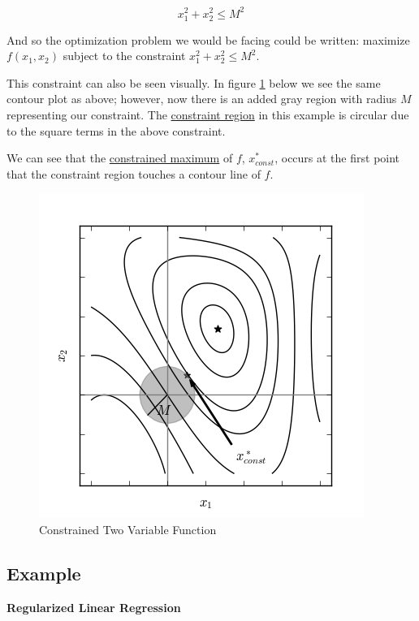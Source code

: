 \documentclass[a4paper, 12pt]{article}
\begin{document}
$$ x^2_1 + x^2_2 \leq M^2 $$

And so the optimization problem we would be facing could be written: maximize $f(x_1, x_2)$ subject to the constraint $ x^2_1 + x^2_2 \leq M^2 $.

\vspace{1pc}

This constraint can also be seen visually. In figure \ref{fig:two_const} below we see the same contour plot as above; however, now there is an added gray region with radius $M$ representing our constraint. The \underline{constraint region} in this example is circular due to the square terms in the above constraint.

\vspace{1pc}

We can see that the \underline{constrained maximum} of $f$, $x^*_{const}$, occurs at the first point that the constraint region touches a contour line of $f$.

\begin{figure}[H]
  \centering
    \includegraphics[scale=1]{images/two_var_constrained.png}
  \caption{Constrained Two Variable Function} \label{fig:two_const}
\end{figure}

\subsection*{Example}

\textbf{Regularized Linear Regression}

\vspace{0.5pc}
\end{document}
